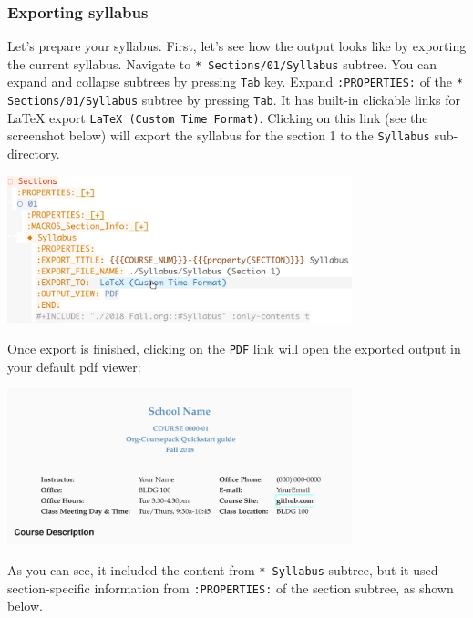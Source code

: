 \documentclass[10pt,article]{article}
\begin{document}
\subsubsection{Exporting syllabus}
\label{sec:orgb6728f7}
Let's prepare your syllabus. First, let's see how the output looks like by
exporting the current syllabus. Navigate to \texttt{* Sections/01/Syllabus} subtree.
You can expand and collapse subtrees by pressing \texttt{Tab} key. Expand
\texttt{:PROPERTIES:} of the \texttt{* Sections/01/Syllabus} subtree by pressing \texttt{Tab}. It
has built-in clickable links for \LaTeX{} export \texttt{LaTeX (Custom Time Format)}.
Clicking on this link (see the screenshot below) will export the syllabus for
the section 1 to the \texttt{Syllabus} sub-directory.

\begin{center}
\includegraphics[width=10cm]{../../../Assets/Images/Org-Teaching/Quickstart_Syllabus-Export-Link.png}
\end{center}

Once export is finished, clicking on the \texttt{PDF} link will open the exported
output in your default pdf viewer:

\begin{center}
\includegraphics[width=10cm]{../../../Assets/Images/Org-Teaching/Quickstart_Exported-Syllabus-Course-Info.png}
\end{center}

 As you can see, it included the content
from \texttt{* Syllabus} subtree, but it used section-specific information from
\texttt{:PROPERTIES:} of the section subtree, as shown below.
\end{document}

